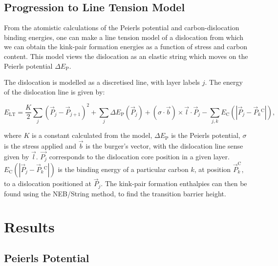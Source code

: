\documentclass[a4paper,11pt]{article}
\begin{document}
\subsection{Progression to Line Tension Model}
\label{sec:org4cd6461}

From the atomistic calculations of the Peierls potential and carbon-dislocation binding energies, one can make a
line tension model of a dislocation from which we can obtain the kink-pair formation energies as
a function of stress and carbon content.  This model views the dislocation as an elastic string
which moves on the Peierls potential \(\Delta E_{\text{P}}\).

The dislocation is modelled as a discretised line, with layer labels \(j\). The energy of the
dislocation line is given by:

\[ E_{\text{LT}} = \frac{K}{2} \sum_j (\vec{P}_j - \vec{P}_{j+1} )^2  + \sum_j \Delta E_{\text{P}}  (\vec{P}_j) +
   (\sigma \cdot \vec{b}) \times \vec{l} \cdot \vec{P}_j  - \sum_{j,k} E_{\text{C}} (|\vec{P}_j-\vec{P}_k^{}^{\text{C}}|), \]

where \(K\) is a constant calculated from the model, \(\Delta E_{\text{P}}\) is the Peierls potential, \(\sigma\) is
the stress applied and \(\vec{b}\) is the burger's vector, with the dislocation line sense given by
\(\vec{l}\). \(\vec{P_{j}}\) corresponds to the dislocation core position in a given
layer. \(E_{\text{C}} (|\vec{P}_j-\vec{P}_k^{}^{\text{C}}|)\) is the binding energy of a particular carbon
\(k\), at position \(\vec{P}_k^{\text{C}}\), to a dislocation positioned at \(\vec{P}_j\). The kink-pair
formation enthalpies can then be found using the NEB/String method, to find the transition
barrier height. 

\section{Results}
\label{sec:org696ba25}

\subsection{Peierls Potential}
\label{sec:org5556dce}
\end{document}
